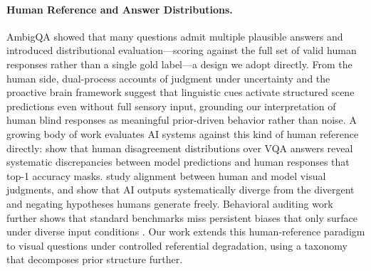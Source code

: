 \documentclass[letterpaper]{article}
\begin{document}
\paragraph{Human Reference and Answer Distributions.}
AmbigQA \citep{min2020ambigqa} showed that many questions admit multiple plausible
answers and introduced distributional evaluation---scoring against the full set of
valid human responses rather than a single gold label---a design we adopt directly. %
From the human side, dual-process accounts of judgment under uncertainty
\citep{tversky1974judgment,kahneman2011thinking} and the proactive brain framework
\citep{bar2007proactive} suggest that linguistic cues activate structured scene
predictions even without full sensory input, grounding our interpretation of human
blind responses as meaningful prior-driven behavior rather than noise.
A growing body of work evaluates AI systems against this kind of human reference
directly: \citet{lan2025mind} show that human disagreement distributions over VQA answers
reveal systematic discrepancies between model predictions and human responses that top-1 accuracy masks. \citet{lee2023visalign} study alignment between human and model visual judgments, and \citet{bao2026imagination} show that AI outputs systematically diverge from the divergent and negating hypotheses humans generate freely.
Behavioral auditing work further shows that standard benchmarks miss persistent
biases that only surface under diverse input conditions
\citep{kwon2025whatllms}.
Our work extends this human-reference paradigm to visual questions under controlled
referential degradation, using a taxonomy that decomposes prior structure further. %

\end{document}
